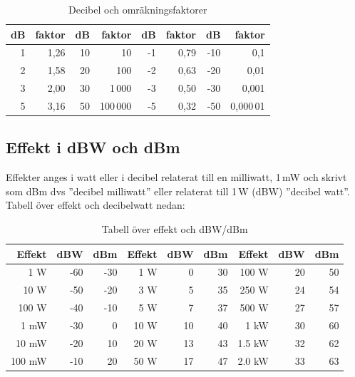\begin{table}[h]
\centering
\begin{tabular}{rr|rr|rr|rr}
	\bf dB & \bf faktor & \bf dB & \bf faktor & \bf dB & \bf faktor & \bf dB & \bf faktor \\ \hline
	     1 &       1,26 &     10 &         10 &     -1 &       0,79 &    -10 &        0,1 \\
	     2 &       1,58 &     20 &        100 &     -2 &       0,63 &    -20 &       0,01 \\
	     3 &       2,00 &     30 &     1\,000 &     -3 &       0,50 &    -30 &      0,001 \\
	     5 &       3,16 &     50 &   100\,000 &     -5 &       0,32 &    -50 &  0,000\,01
\end{tabular}
\caption{Decibel och omräkningsfaktorer}
\end{table}

\subsection{Effekt i dBW och dBm}
 

Effekter anges i watt eller i decibel relaterat till en milliwatt, 1\,mW och skrivt som dBm dvs ''decibel
milliwatt'' eller relaterat till 1\,W (dBW) ''decibel watt''. Tabell över effekt och
decibelwatt nedan:

\begin{table}[H]
\centering
\begin{tabular}{rrr|rrr|rrr}
	\textbf{Effekt} & \textbf{dBW} & \textbf{dBm} & \textbf{Effekt} & \textbf{dBW} & \textbf{dBm} & \textbf{Effekt} & \textbf{dBW} & \textbf{dBm} \\ \hline
	    1 \textmu W &          -60 &          -30 &             1 W &            0 &           30 &           100 W &           20 &           50 \\
	   10 \textmu W &          -50 &          -20 &             3 W &            5 &           35 &           250 W &           24 &           54 \\
	  100 \textmu W &          -40 &          -10 &             5 W &            7 &           37 &           500 W &           27 &           57 \\
	           1 mW &          -30 &            0 &            10 W &           10 &           40 &            1 kW &           30 &           60 \\
	          10 mW &          -20 &           10 &            20 W &           13 &           43 &          1.5 kW &           32 &           62 \\
	         100 mW &          -10 &           20 &            50 W &           17 &           47 &          2.0 kW &           33 &           63
\end{tabular}
\caption{Tabell över effekt och dBW/dBm}
\end{table}


